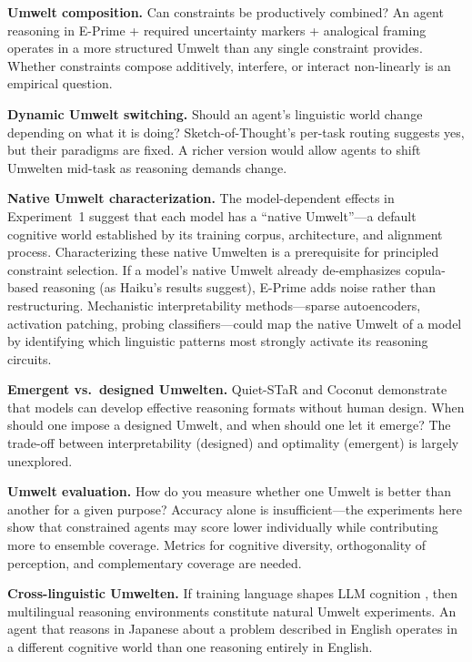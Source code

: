 \documentclass[11pt,a4paper]{article}
\begin{document}
\textbf{Umwelt composition.} Can constraints be productively combined? An agent reasoning in E-Prime + required uncertainty markers + analogical framing operates in a more structured Umwelt than any single constraint provides. Whether constraints compose additively, interfere, or interact non-linearly is an empirical question.

\textbf{Dynamic Umwelt switching.} Should an agent's linguistic world change depending on what it is doing? Sketch-of-Thought's per-task routing \citep{sketch2025} suggests yes, but their paradigms are fixed. A richer version would allow agents to shift Umwelten mid-task as reasoning demands change.

\textbf{Native Umwelt characterization.} The model-dependent effects in Experiment~1 suggest that each model has a ``native Umwelt''---a default cognitive world established by its training corpus, architecture, and alignment process. Characterizing these native Umwelten is a prerequisite for principled constraint selection. If a model's native Umwelt already de-emphasizes copula-based reasoning (as Haiku's results suggest), E-Prime adds noise rather than restructuring. Mechanistic interpretability methods---sparse autoencoders, activation patching, probing classifiers---could map the native Umwelt of a model by identifying which linguistic patterns most strongly activate its reasoning circuits.

\textbf{Emergent vs.\ designed Umwelten.} Quiet-STaR and Coconut demonstrate that models can develop effective reasoning formats without human design. When should one impose a designed Umwelt, and when should one let it emerge? The trade-off between interpretability (designed) and optimality (emergent) is largely unexplored.

\textbf{Umwelt evaluation.} How do you measure whether one Umwelt is better than another for a given purpose? Accuracy alone is insufficient---the experiments here show that constrained agents may score lower individually while contributing more to ensemble coverage. Metrics for cognitive diversity, orthogonality of perception, and complementary coverage are needed.

\textbf{Cross-linguistic Umwelten.} If training language shapes LLM cognition \citep{wang2025}, then multilingual reasoning environments constitute natural Umwelt experiments. An agent that reasons in Japanese about a problem described in English operates in a different cognitive world than one reasoning entirely in English.
\end{document}
